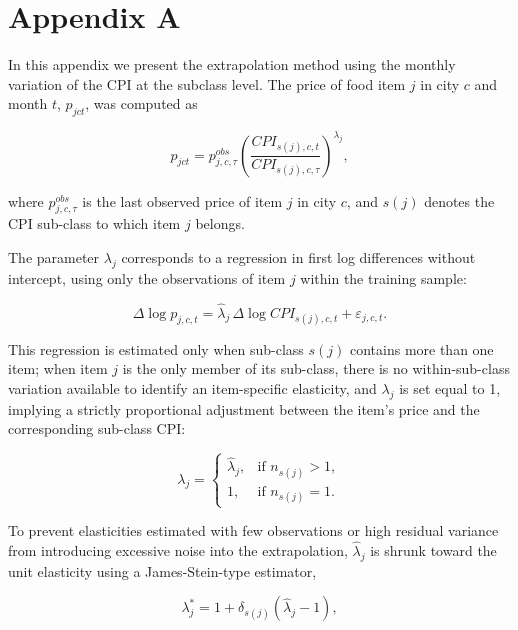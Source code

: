 \documentclass[Afour, sageh,times]{sagej}
\begin{document}
\section*{Appendix A}
\label{secA_prices}

In this appendix we present the extrapolation method using the monthly variation of the CPI at the subclass level. The price of food item $j$ in city $c$ and month $t$, $p_{jct}$, was computed as

\begin{equation}
p_{jct}=p_{j,c,\tau}^{obs}\left(\frac{CPI_{s(j),c,t}}{CPI_{s(j),c,\tau}}\right)^{\lambda_j},
\end{equation}

where $p_{j,c,\tau}^{obs}$ is the last observed price of item $j$ in city $c$, and $s(j)$ denotes the CPI sub-class to which item $j$ belongs.

The parameter $\lambda_j$ corresponds to a regression in first log differences without intercept, using only the observations of item $j$ within the training sample:

\begin{equation}
\Delta \log p_{j,c,t} = \hat{\lambda}_j \, \Delta \log CPI_{s(j),c,t} + \varepsilon_{j,c,t}.
\end{equation}

This regression is estimated only when sub-class $s(j)$ contains more than one item; when item $j$ is the only member of its sub-class, there is no within-sub-class variation available to identify an item-specific elasticity, and $\lambda_j$ is set equal to 1, implying a strictly proportional adjustment between the item's price and the corresponding sub-class CPI:

\begin{equation}
\lambda_j=
\begin{cases}
\hat{\lambda}_j, & \text{if } n_{s(j)} > 1,\\[6pt]
1, & \text{if } n_{s(j)} = 1.
\end{cases}
\end{equation}

To prevent elasticities estimated with few observations or high residual variance from introducing excessive noise into the extrapolation, $\hat{\lambda}_j$ is shrunk toward the unit elasticity using a James-Stein-type estimator,

\begin{equation}
\lambda_j^{*} = 1 + \delta_{s(j)}\left(\hat{\lambda}_j - 1\right),
\end{equation}
\end{document}
